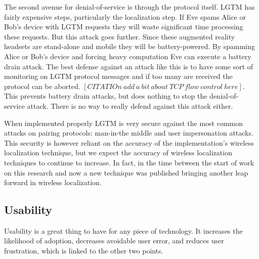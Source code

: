 \documentclass[12pt]{report}
\begin{document}
The second avenue for denial-of-service is through the protocol itself. LGTM has fairly expensive steps, particularly the localization step. If Eve spams Alice or Bob's device with LGTM requests they will waste significant time processing these requests. But this attack goes further. Since these augmented reality headsets are stand-alone and mobile they will be battery-powered. By spamming Alice or Bob's device and forcing heavy computation Eve can execute a battery drain attack. The best defense against an attack like this is to have some sort of monitoring on LGTM protocol messages and if too many are received the protocol can be aborted. $[CITATIOn \: add \: a \: bit \: about \: TCP \: flow \: control \: here]$. This prevents battery drain attacks, but does nothing to stop the denial-of-service attack. There is no way to really defend against this attack either. \par

When implemented properly LGTM is very secure against the most common attacks on pairing protocols: man-in-the middle and user impersonation attacks. This security is however reliant on the accuracy of the implementation's wireless localization technique, but we expect the accuracy of wireless localization techniques to continue to increase. In fact, in the time between the start of work on this research and now a new technique was published \cite{ChronosSingleAPLocalizationVasisht2016} bringing another leap forward in wireless localization. \par


\subsection{Usability}
Usability is a great thing to have for any piece of technology. It increases the likelihood of adoption, decreases avoidable user error, and reduces user frustration, which is linked to the other two points. \par
\end{document}
